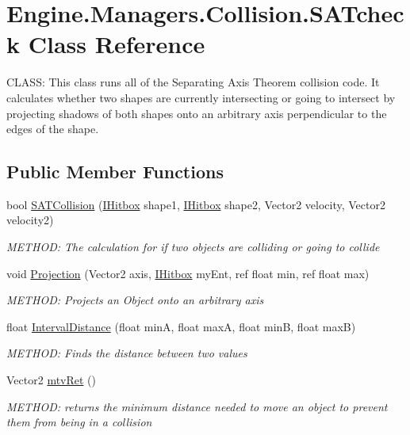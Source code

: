 \hypertarget{a00510}{}\section{Engine.\+Managers.\+Collision.\+S\+A\+Tcheck Class Reference}
\label{a00510}


C\+L\+A\+SS\+: This class runs all of the Separating Axis Theorem collision code. It calculates whether two shapes are currently intersecting or going to intersect by projecting shadows of both shapes onto an arbitrary axis perpendicular to the edges of the shape.  


\subsection*{Public Member Functions}
\begin{DoxyCompactItemize}
\item 
bool \hyperlink{a00510_a466b04bf6d509f7a713b7aec38391e51}{S\+A\+T\+Collision} (\hyperlink{a00434}{I\+Hitbox} shape1, \hyperlink{a00434}{I\+Hitbox} shape2, Vector2 velocity, Vector2 velocity2)
\begin{DoxyCompactList}\small\item\em M\+E\+T\+H\+OD\+: The calculation for if two objects are colliding or going to collide \end{DoxyCompactList}\item 
void \hyperlink{a00510_a566a1183f83e123c710bd3cc1d240aef}{Projection} (Vector2 axis, \hyperlink{a00434}{I\+Hitbox} my\+Ent, ref float min, ref float max)
\begin{DoxyCompactList}\small\item\em M\+E\+T\+H\+OD\+: Projects an Object onto an arbitrary axis \end{DoxyCompactList}\item 
float \hyperlink{a00510_a5e692998d63a129d3fed2163bcbf8a55}{Interval\+Distance} (float minA, float maxA, float minB, float maxB)
\begin{DoxyCompactList}\small\item\em M\+E\+T\+H\+OD\+: Finds the distance between two values \end{DoxyCompactList}\item 
Vector2 \hyperlink{a00510_a4aa620a587dc54dd480fd0a9fd29d817}{mtv\+Ret} ()
\begin{DoxyCompactList}\small\item\em M\+E\+T\+H\+OD\+: returns the minimum distance needed to move an object to prevent them from being in a collision \end{DoxyCompactList}\end{DoxyCompactItemize}
